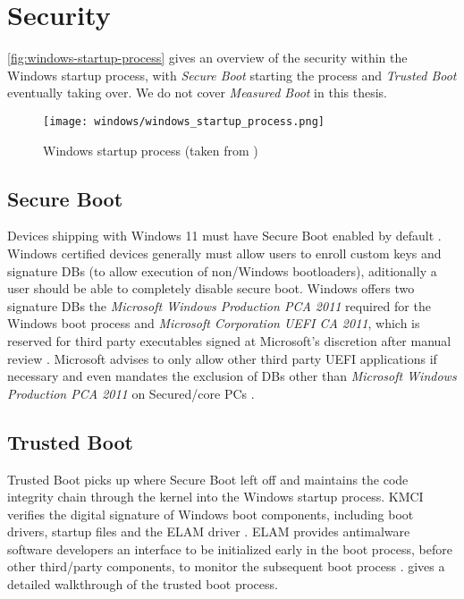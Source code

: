 
\section{Security}

\autoref{fig:windows-startup-process} gives an overview of the security within the Windows startup process, with \emph{Secure Boot} starting the process and \emph{Trusted Boot} eventually taking over.
We do not cover \emph{Measured Boot} in this thesis.

\begin{figure}[phtb]
    \centering
    \texttt{[image: windows/windows\_startup\_process.png]}
    \caption[Windows startup process]{Windows startup process (taken from \cite{microsoft-secure-the-windows-boot-process})}
    \label{fig:windows-startup-process}
\end{figure}

\subsection{Secure Boot}

Devices shipping with Windows 11 must have Secure Boot enabled by default \cite{microsoft-windows-minimum-hardware-requirements-overview}.
Windows certified devices generally must allow users to enroll custom keys and signature \acp{DB} (to allow execution of non\-/Windows bootloaders), aditionally a user should be able to completely disable secure boot.
Windows offers two signature \acp{DB} the \emph{Microsoft Windows Production PCA 2011} required for the Windows boot process and \emph{Microsoft Corporation \ac{UEFI} \ac{CA} 2011}, which is reserved for third party executables signed at Microsoft's discretion after manual review \cite{microsoft-uefi-signing}.
Microsoft advises to only allow other third party \ac{UEFI} applications if necessary and even mandates the exclusion of \acp{DB} other than \emph{Microsoft Windows Production PCA 2011} on Secured\-/core \acp{PC} \cite{microsoft-secure-the-windows-boot-process}.

\subsection{Trusted Boot}

Trusted Boot picks up where Secure Boot left off and maintains the code integrity chain through the kernel into the Windows startup process.
\ac{KMCI} verifies the digital signature of Windows boot components, including boot drivers, startup files and the \ac{ELAM} driver \cite{microsoft-trusted-boot}.
\ac{ELAM} provides antimalware software developers an interface to be initialized early in the boot process, before other third\-/party components, to monitor the subsequent boot process \cite{micosoft-windows-elam}.
\cite{understanding-windows-trusted-boot} gives a detailed walkthrough of the trusted boot process.

